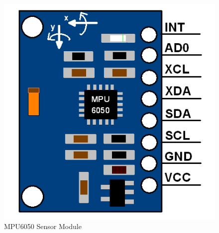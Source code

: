 \begin{figure}[H]
    \centering
    \includegraphics[scale=0.8]{Figures/MPU6050_Module.png}
    \caption{MPU6050 Sensor Module}
    \label{fig:my_label}
\end{figure}


